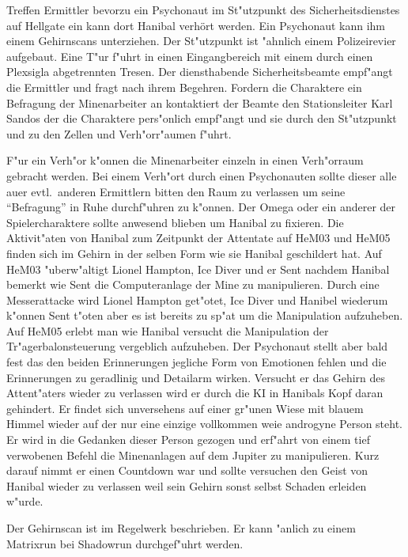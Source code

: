 
Treffen Ermittler bevorzu ein Psychonaut im St"utzpunkt des Sicherheitsdienstes auf Hellgate ein kann dort Hanibal verhört werden. Ein Psychonaut kann ihm einem Gehirnscans unterziehen. Der St"utzpunkt ist "ahnlich einem Polizeirevier aufgebaut. Eine T"ur f"uhrt in einen Eingangbereich mit einem durch einen Plexsigla\3 abgetrennten Tresen. Der diensthabende Sicherheitsbeamte empf"angt die Ermittler und fragt nach ihrem Begehren. Fordern die Charaktere ein Befragung der Minenarbeiter an kontaktiert der Beamte den Stationsleiter Karl Sandos der die Charaktere pers"onlich empf"angt und sie durch den St"utzpunkt und zu den Zellen und Verh"orr"aumen f"uhrt.

F"ur ein Verh"or k"onnen die Minenarbeiter einzeln in einen Verh"orraum gebracht werden. Bei einem Verh"ort durch einen Psychonauten sollte dieser alle au\3er evtl.~anderen Ermittlern bitten den Raum zu verlassen um seine "`Befragung"' in Ruhe durchf"uhren zu k"onnen. Der Omega oder ein anderer der Spielercharaktere sollte anwesend blieben um Hanibal zu fixieren. Die Aktivit"aten von Hanibal zum Zeitpunkt der Attentate auf HeM03 und HeM05 finden sich im Gehirn in der selben Form wie sie Hanibal geschildert hat. Auf HeM03 "uberw"altigt Lionel Hampton, Ice Diver und er Sent nachdem Hanibal bemerkt wie Sent die Computeranlage der Mine zu manipulieren. Durch eine Messerattacke wird Lionel Hampton get"otet, Ice Diver und Hanibel wiederum k"onnen Sent t"oten aber es ist bereits zu sp"at um die Manipulation aufzuheben. Auf HeM05 erlebt man wie Hanibal versucht die Manipulation der Tr"agerbalonsteuerung vergeblich aufzuheben. Der Psychonaut stellt aber bald fest das den beiden Erinnerungen jegliche Form von Emotionen fehlen und die Erinnerungen zu geradlinig und Detailarm wirken. Versucht er das Gehirn des Attent"aters wieder zu verlassen wird er durch die KI in Hanibals Kopf daran gehindert. Er findet sich unversehens auf einer gr"unen Wiese mit blauem Himmel wieder auf der nur eine einzige vollkommen wei\3e androgyne Person steht. Er wird in die Gedanken dieser Person gezogen und erf"ahrt von einem tief verwobenen Befehl die Minenanlagen auf dem Jupiter zu manipulieren. Kurz darauf nimmt er einen Countdown war und sollte versuchen den Geist von Hanibal wieder zu verlassen weil sein Gehirn sonst selbst Schaden erleiden w"urde.

\begin{remarks}
	Der Gehirnscan ist im Regelwerk beschrieben. Er kann "anlich zu einem Matrixrun bei Shadowrun durchgef"uhrt werden.
\end{remarks}

